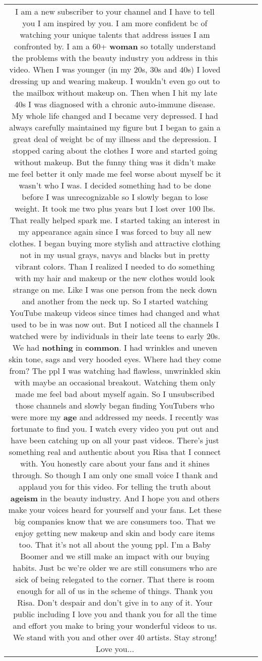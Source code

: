 \documentclass[11pt]{article}
\newlength\mylength
\begin{document}
\begin{center}
\begin{longtable}{|C{.65\mylength}|C{.30\mylength}|C{.12\mylength}|C{.12\mylength}|C{.12\mylength}|}
  \small I am a new subscriber to your channel and I have to tell you I am inspired by you. I am more confident bc of watching your unique talents that address issues I am confronted by. I am a 60+ \textbf{woman} so totally understand the problems with the beauty industry you address in this video. When I was younger (in my 20s, 30s and 40s) I loved dressing up and wearing makeup. I wouldn't even go out to the mailbox without makeup on. Then when I hit my late 40s I was diagnosed with a chronic auto-immune disease. My whole life changed and I became very depressed. I had always carefully maintained my figure but I began to gain a great deal of weight bc of my illness and the depression. I stopped caring about the clothes I wore and started going without makeup. But the funny thing was it didn't make me feel better it only made me feel worse about myself bc it wasn't who I was. I decided something had to be done before I was unrecognizable so I slowly began to lose weight. It took me two plus years but I lost over 100 lbs. That really helped spark me. I started taking an interest in my appearance again since I was forced to buy all new clothes. I began buying more stylish and attractive clothing not in my usual grays, navys and blacks but in pretty vibrant colors. Than I realized I needed to do something with my hair and makeup or the new clothes would look strange on me. Like I was one person from the neck down and another from the neck up. So I started watching YouTube makeup videos since times had changed and what used to be in was now out. But I noticed all the channels I watched were by individuals in their late teens to early 20s. We had \textbf{nothing} in \textbf{common}. I had wrinkles and uneven skin tone, sags and very hooded eyes. Where had they come from? The ppl I was watching had flawless, unwrinkled skin with maybe an occasional breakout. Watching them only made me feel bad about myself again. So I unsubscribed those channels and slowly began finding YouTubers who were more my \textbf{age} and addressed my needs. I recently was fortunate to find you. I watch every video you put out and have been catching up on all your past videos. There's just something real and authentic about you Risa that I connect with. You honestly care about your fans and it shines through. So though I am only one small voice I thank and applaud you for this video. For telling the truth about \textbf{ageism} in the beauty industry. And I hope you and others make your voices heard for yourself and your fans. Let these big companies know that we are consumers too. That we enjoy getting new makeup and skin and body care items too. That it's not all about the young ppl. I'm a Baby Boomer and we still make an impact with our buying habits. Just bc we're older we are still consumers who are sick of being relegated to the corner. That there is room enough for all of us in the scheme of things. Thank you Risa. Don't despair and don't give in to any of it. Your public including I love you and thank you for all the time and effort you make to bring your wonderful videos to us. We stand with you and other over 40 artists. Stay strong! Love you...\normalsize   & 
\end{longtable}
\end{center}
\end{document}
